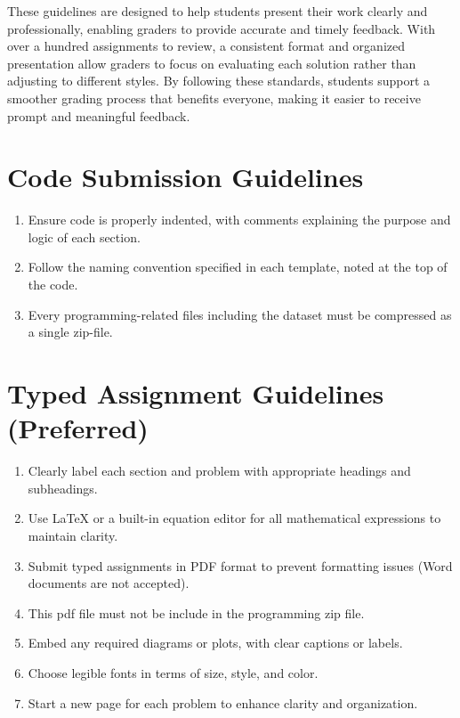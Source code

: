 These guidelines are designed to help students present their work clearly and professionally, enabling graders to provide accurate and timely feedback. With over a hundred assignments to review, a consistent format and organized presentation allow graders to focus on evaluating each solution rather than adjusting to different styles. By following these standards, students support a smoother grading process that benefits everyone, making it easier to receive prompt and meaningful feedback.

\section*{Code Submission Guidelines}
\begin{enumerate}[label=\arabic*.]
    \item Ensure code is properly indented, with comments explaining the purpose and logic of each section.
    \item Follow the naming convention specified in each template, noted at the top of the code.
    \item Every programming-related files including the dataset must be compressed as a single zip-file. 
\end{enumerate}

\section*{Typed Assignment Guidelines (Preferred)}
\begin{enumerate}[label=\arabic*.]
    \item Clearly label each section and problem with appropriate headings and subheadings.
    \item Use LaTeX or a built-in equation editor for all mathematical expressions to maintain clarity.
    \item Submit typed assignments in PDF format to prevent formatting issues (Word documents are not accepted).
    \item This pdf file must not be include in the programming zip file. 
    \item Embed any required diagrams or plots, with clear captions or labels.
    \item Choose legible fonts in terms of size, style, and color.
    \item Start a new page for each problem to enhance clarity and organization.
\end{enumerate}

